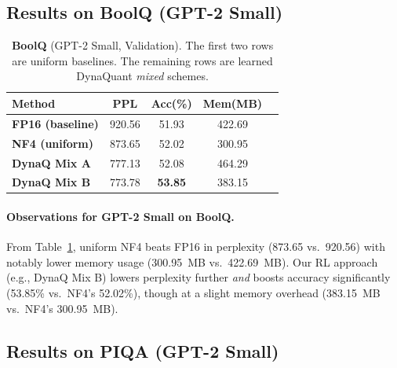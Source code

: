 \documentclass{article}
\begin{document}
	\subsection{Results on BoolQ (GPT-2 Small)}
	\label{sec:boolq-small}
	
	\begin{table}[ht]
		\centering
		\caption{\small \textbf{BoolQ} (GPT-2 Small, Validation). The first two rows are uniform baselines. The remaining rows are learned DynaQuant \emph{mixed} schemes.}
		\label{tab:boolq-small}
		\begin{tabular}{lcccc}
			\toprule
			\textbf{Method} & \textbf{PPL} & \textbf{Acc(\%)} & \textbf{Mem(MB)} \\
			\midrule
			\textbf{FP16 (baseline)}  & 920.56 & 51.93 & 422.69 \\
			\textbf{NF4 (uniform)}    & 873.65 & 52.02 & 300.95 \\
			\midrule
			\textbf{DynaQ Mix A}      & 777.13 & 52.08 & 464.29 \\
			\textbf{DynaQ Mix B}      & 773.78 & \textbf{53.85} & 383.15 \\
			\bottomrule
		\end{tabular}
		\vspace{-1em}
	\end{table}
	
	\paragraph{Observations for GPT-2 Small on BoolQ.}
	From Table~\ref{tab:boolq-small}, uniform NF4 beats FP16 in perplexity (873.65 vs.\ 920.56) with notably lower memory usage (300.95~MB vs.\ 422.69~MB). Our RL approach (e.g., DynaQ Mix B) lowers perplexity further \emph{and} boosts accuracy significantly (53.85\% vs.\ NF4’s 52.02\%), though at a slight memory overhead (383.15~MB vs.\ NF4’s 300.95~MB).
	
	\subsection{Results on PIQA (GPT-2 Small)}
	\label{sec:piqa-small}
	
\end{document}
